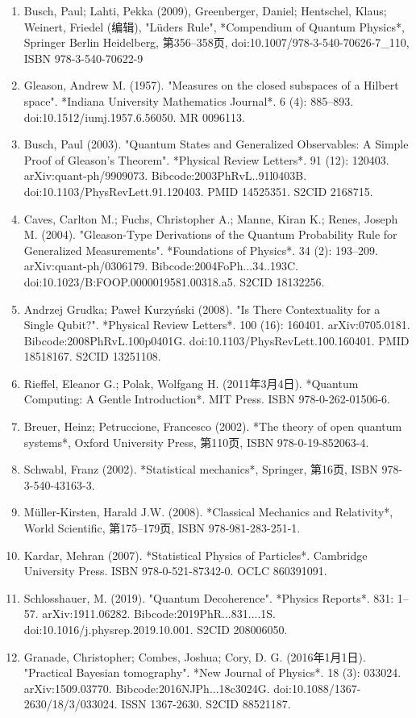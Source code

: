 \begin{enumerate}
\item Busch, Paul; Lahti, Pekka (2009), Greenberger, Daniel; Hentschel, Klaus; Weinert, Friedel (编辑), "Lüders Rule", *Compendium of Quantum Physics*, Springer Berlin Heidelberg, 第356–358页, doi:10.1007/978-3-540-70626-7_110, ISBN 978-3-540-70622-9  
\item Gleason, Andrew M. (1957). "Measures on the closed subspaces of a Hilbert space". *Indiana University Mathematics Journal*. 6 (4): 885–893. doi:10.1512/iumj.1957.6.56050. MR 0096113.  
\item Busch, Paul (2003). "Quantum States and Generalized Observables: A Simple Proof of Gleason's Theorem". *Physical Review Letters*. 91 (12): 120403. arXiv:quant-ph/9909073. Bibcode:2003PhRvL..91l0403B. doi:10.1103/PhysRevLett.91.120403. PMID 14525351. S2CID 2168715.
\item Caves, Carlton M.; Fuchs, Christopher A.; Manne, Kiran K.; Renes, Joseph M. (2004). "Gleason-Type Derivations of the Quantum Probability Rule for Generalized Measurements". *Foundations of Physics*. 34 (2): 193–209. arXiv:quant-ph/0306179. Bibcode:2004FoPh...34..193C. doi:10.1023/B:FOOP.0000019581.00318.a5. S2CID 18132256.  
\item Andrzej Grudka; Paweł Kurzyński (2008). "Is There Contextuality for a Single Qubit?". *Physical Review Letters*. 100 (16): 160401. arXiv:0705.0181. Bibcode:2008PhRvL.100p0401G. doi:10.1103/PhysRevLett.100.160401. PMID 18518167. S2CID 13251108.  
\item Rieffel, Eleanor G.; Polak, Wolfgang H. (2011年3月4日). *Quantum Computing: A Gentle Introduction*. MIT Press. ISBN 978-0-262-01506-6.  
\item Breuer, Heinz; Petruccione, Francesco (2002). *The theory of open quantum systems*, Oxford University Press, 第110页, ISBN 978-0-19-852063-4.  
\item Schwabl, Franz (2002). *Statistical mechanics*, Springer, 第16页, ISBN 978-3-540-43163-3.  
\item Müller-Kirsten, Harald J.W. (2008). *Classical Mechanics and Relativity*, World Scientific, 第175–179页, ISBN 978-981-283-251-1.  
\item Kardar, Mehran (2007). *Statistical Physics of Particles*. Cambridge University Press. ISBN 978-0-521-87342-0. OCLC 860391091.
\item Schlosshauer, M. (2019). "Quantum Decoherence". *Physics Reports*. 831: 1–57. arXiv:1911.06282. Bibcode:2019PhR...831....1S. doi:10.1016/j.physrep.2019.10.001. S2CID 208006050.  
\item Granade, Christopher; Combes, Joshua; Cory, D. G. (2016年1月1日). "Practical Bayesian tomography". *New Journal of Physics*. 18 (3): 033024. arXiv:1509.03770. Bibcode:2016NJPh...18c3024G. doi:10.1088/1367-2630/18/3/033024. ISSN 1367-2630. S2CID 88521187.  

\end{enumerate}
